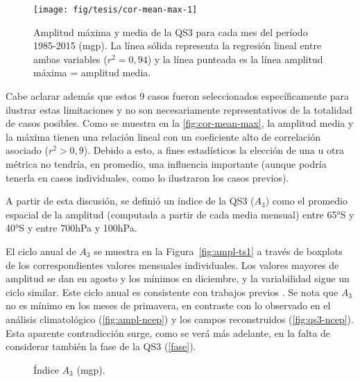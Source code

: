 \documentclass[spanish,a4paper,12pt,oneside]{book}
\begin{document}
\begin{figure}
\texttt{[image: fig/tesis/cor-mean-max-1]} \caption{Amplitud máxima y media de la QS3 para cada mes del período 1985-2015 (mgp). La línea sólida representa la regresión lineal entre ambas variables ($r^2 = 0,94 $) y la línea punteada es la línea amplitud máxima = amplitud media.}\label{fig:cor-mean-max}
\end{figure}

Cabe aclarar además que estos 9 casos fueron seleccionados
específicamente para ilustrar estas limitaciones y no son necesariamente
representativos de la totalidad de casos posibles. Como se muestra en la
\autoref{fig:cor-mean-max}, la amplitud media y la máxima tienen una
relación lineal con un coeficiente alto de correlación asociado
(\(r^2>0,9\)). Debido a esto, a fines estadísticos la elección de una u
otra métrica no tendría, en promedio, una influencia importante (aunque
podría tenerla en casos individuales, como lo ilustraron los casos
previos).

A partir de esta discusión, se definió un índice de la QS3 (\(A_3\))
como el promedio espacial de la amplitud (computada a partir de cada
media mensual) entre 65°S y 40°S y entre 700hPa y 100hPa.

El ciclo anual de \(A_3\) se muestra en la Figura~\ref{fig:ampl-ts1} a
través de boxplots de los correspondientes valores mensuales
individuales. Los valores mayores de amplitud se dan en agosto y los
mínimos en diciembre, y la variabilidad sigue un ciclo similar. Este
ciclo anual es consistente con trabajos previos
\citep{Loon1972, Karoly1985, Raphael2004}. Se nota que \(A_3\) no es
mínimo en los meses de primavera, en contraste con lo observado en el
análisis climatológico (\autoref{fig:ampl-ncep}) y los campos
reconstruidos (\autoref{fig:qs3-ncep}). Esta aparente contradicción
surge, como se verá más adelante, en la falta de considerar también la
fase de la QS3 (\autoref{fase}).

\begin{figure}
\newline{}\caption{Índice $A_3$ (mgp).}\label{fig:ampl-ts}
\end{figure}
\end{document}

